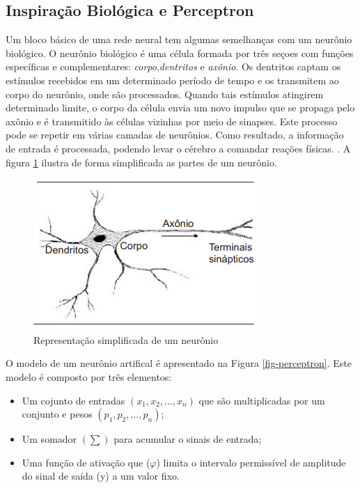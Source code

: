 \subsection{Inspiração Biológica e Perceptron}

Um bloco básico de uma rede neural tem algumas semelhanças com um neurônio biológico. O neurônio biológico é uma célula formada por três seçoes com funções específicas e complementares: \textit{corpo},\textit{dentritos} e \textit{axônio}. Os dentritos captam os estímulos recebidos em um determinado período de tempo e os transmitem ao corpo do neurônio, onde são processados. Quando tais estímulos atingirem determinado limite, o corpo da célula envia um novo impulso que se propaga pelo axônio e é transmitido às células vizinhas por meio de sinapses.  Este processo pode se repetir em várias camadas de neurônios. Como resultado, a informação de entrada é processada, podendo levar o cérebro a comandar reações físicas.  \cite{ferneda2006}. A figura \ref{fig-neuronio} ilustra de forma simplificada as partes de um neurônio.

\begin{figure}[h]
	\centering
	\includegraphics[scale=0.5]{pasta1_figuras/neuronio.png}
	\caption{Representação simplificada de um neurônio}
	\label{fig-neuronio}
\end{figure}

O modelo de um neurônio artifical é apresentado na Figura \ref{fig-perceptron}. Este modelo é composto por três elementos:
\begin{itemize}
	\item Um cojunto de entradas $(x_1,x_2,...,x_n)$ que são multiplicadas por um conjunto e pesos $(p_1,p_2,...,p_n)$;
	\item Um somador $(\sum)$ para acumular o sinais de entrada;
	\item Uma função de ativação que ($\varphi$) limita o intervalo permissível de amplitude do sinal de saída (y) a um valor fixo.
\end{itemize}

